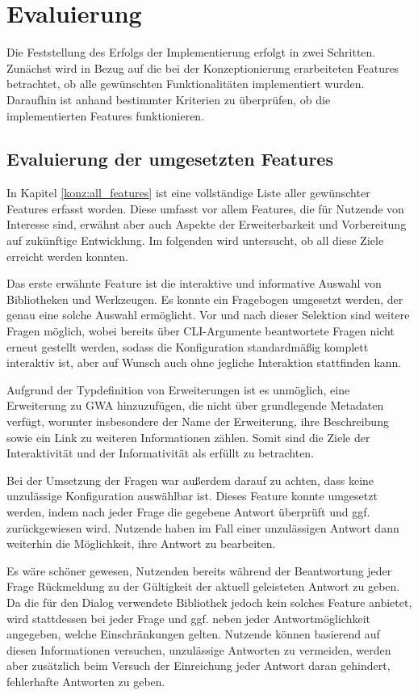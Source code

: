 \section{Evaluierung}
\label{eval}
Die Feststellung des Erfolgs der Implementierung erfolgt in zwei Schritten. Zunächst wird in Bezug auf die bei der Konzeptionierung erarbeiteten Features betrachtet, ob alle gewünschten Funktionalitäten implementiert wurden. Daraufhin ist anhand bestimmter Kriterien zu überprüfen, ob die implementierten Features funktionieren.

\subsection{Evaluierung der umgesetzten Features}
In Kapitel \ref{konz:all_features} ist eine vollständige Liste aller gewünschter Features erfasst worden. Diese umfasst vor allem Features, die für Nutzende von Interesse sind, erwähnt aber auch Aspekte der Erweiterbarkeit und Vorbereitung auf zukünftige Entwicklung. Im folgenden wird untersucht, ob all diese Ziele erreicht werden konnten.

Das erste erwähnte Feature ist die interaktive und informative Auswahl von Bibliotheken und Werkzeugen. Es konnte ein Fragebogen umgesetzt werden, der genau eine solche Auswahl ermöglicht. Vor und nach dieser Selektion sind weitere Fragen möglich, wobei bereits über \gls{CLI}-Argumente beantwortete Fragen nicht erneut gestellt werden, sodass die Konfiguration standardmäßig komplett interaktiv ist, aber auf Wunsch auch ohne jegliche Interaktion stattfinden kann.

Aufgrund der Typdefinition von Erweiterungen ist es unmöglich, eine Erweiterung zu \gls{GWA} hinzuzufügen, die nicht über grundlegende Metadaten verfügt, worunter insbesondere der Name der Erweiterung, ihre Beschreibung sowie ein Link zu weiteren Informationen zählen. Somit sind die Ziele der Interaktivität und der Informativität als erfüllt zu betrachten.

Bei der Umsetzung der Fragen war außerdem darauf zu achten, dass keine unzulässige Konfiguration auswählbar ist. Dieses Feature konnte umgesetzt werden, indem nach jeder Frage die gegebene Antwort überprüft und ggf. zurückgewiesen wird. Nutzende haben im Fall einer unzulässigen Antwort dann weiterhin die Möglichkeit, ihre Antwort zu bearbeiten.

Es wäre schöner gewesen, Nutzenden bereits während der Beantwortung jeder Frage Rückmeldung zu der Gültigkeit der aktuell geleisteten Antwort zu geben. Da die für den Dialog verwendete Bibliothek jedoch kein solches Feature anbietet, wird stattdessen bei jeder Frage und ggf. neben jeder Antwortmöglichkeit angegeben, welche Einschränkungen gelten. Nutzende können basierend auf diesen Informationen versuchen, unzulässige Antworten zu vermeiden, werden aber zusätzlich beim Versuch der Einreichung jeder Antwort daran gehindert, fehlerhafte Antworten zu geben.

